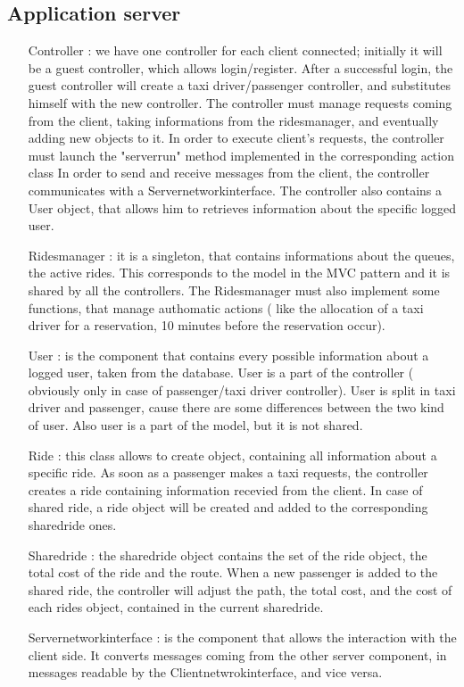 	\subsection{Application server}
	\begin{itemize}
	 \item [Controller]: we have one controller for each client connected; initially it will be a guest controller,
	 which allows login/register. After a successful login, the guest controller will create a taxi driver/passenger controller,
	 and substitutes himself with the new controller. The controller must manage requests coming from
	 the client, taking informations from the ridesmanager, and eventually adding new objects to it.
	 In order to execute client's requests, the controller must launch the "serverrun" method implemented in the corresponding action class
	 In order to send and receive messages from the client, the controller communicates with a Servernetworkinterface.
	 The controller also contains a User object, that allows him to retrieves information about the specific logged user.
	 \item [Ridesmanager]: it is a singleton, that contains informations about the queues, the active rides. This corresponds 
	 to the model in the MVC pattern and it is shared by all the controllers.
	 The Ridesmanager must also implement some functions, that manage authomatic actions ( like the allocation of a taxi driver for a reservation,
	 10 minutes before the reservation occur).
	 \item [User]: is the component that contains every possible information about a logged user, taken from the database.
	 User is a part of the controller ( obviously only in case of passenger/taxi driver controller).
	 User is split in taxi driver and passenger, cause there are some differences between the two kind of user.
	 Also user is a part of the model, but it is not shared.
	 \item[Ride]: this class allows to create object, containing all information about a specific ride. 
	 As soon as a passenger makes a taxi requests, the controller creates a ride containing information recevied from the client.
	 In case of shared ride, a ride object will be created and added to the corresponding sharedride ones.
	 \item[Sharedride]: the sharedride object contains the set of the ride object, the total cost of the ride and the route.
	 When a new passenger is added to the shared ride, the controller will adjust the path, the total cost, and the cost of each
	 rides object, contained in the current sharedride.
	 \item[Servernetworkinterface]: is the component that allows the interaction with the client side. It converts messages coming from
	 the other server component, in messages readable by the Clientnetwrokinterface, and vice versa.
	\end{itemize}
